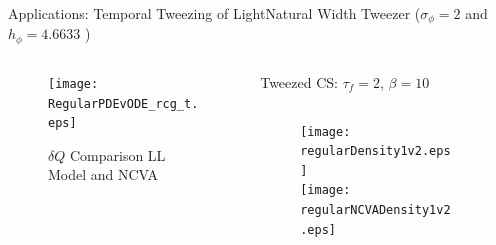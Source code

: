 \begin{frame}[c]{Applications: Temporal Tweezing of Light}{\textcolor{paleblue}{Natural Width Tweezer} ($\sigma_\phi = 2$ and $h_\phi  = 4.6633$ )}

\begin{columns}

\begin{column}{0.28\textwidth}

\vspace{-7em}
\begin{framed}
\vspace{-1em}
\begin{figure}[h]
\centering
\centerline{\texttt{[image: RegularPDEvODE\_rcg\_t.eps]}\hspace*{0cm}}
\caption{\tiny $\delta Q$ Comparison LL Model and NCVA}
\end{figure}
\vspace{-1em}
\end{framed}
\end{column}
\vrule width 1pt

\begin{column}{0.75\textwidth}
\vspace{-0.5em}
\centering
{\small Tweezed CS:  $\tau_f =2$, $\beta = 10$ }
\vspace{0.5em}
\begin{columns}
\begin{column}{0.5\textwidth}
\vspace{-1em}
\begin{figure}
\hspace{2em}\texttt{[image: regularDensity1v2.eps]}  \\
\vspace{-0.5em}
\hspace{2em}\texttt{[image: regularNCVADensity1v2.eps]} 
\end{figure}
\end{column}
\begin{column}{0.5\textwidth}
\vspace{-0.5em} \raggedright
\hspace{-2em}%
\end{column}
\end{columns}
\vspace{0.5em}


\end{column}
\end{columns}
\end{frame}
